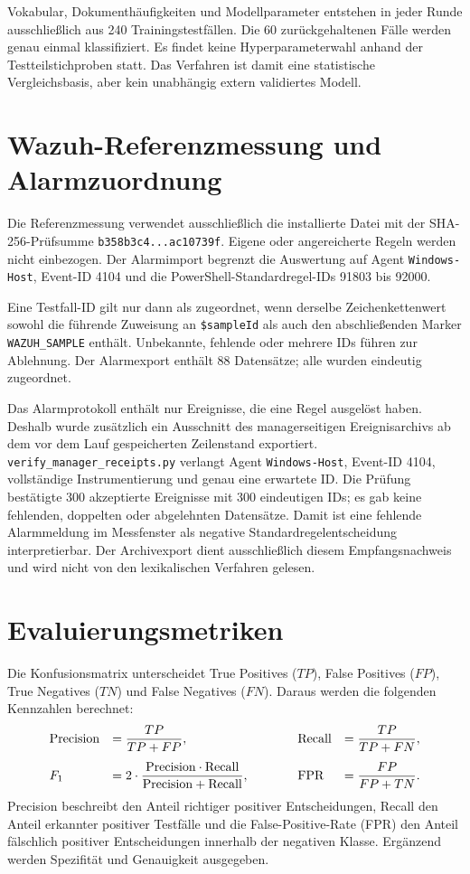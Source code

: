 \documentclass[12pt,a4paper,oneside,parskip=half]{scrreprt}
\begin{document}
Vokabular, Dokumenthäufigkeiten und Modellparameter entstehen in jeder Runde ausschließlich aus 240 Trainingstestfällen. Die 60 zurückgehaltenen Fälle werden genau einmal klassifiziert. Es findet keine Hyperparameterwahl anhand der Testteilstichproben statt. Das Verfahren ist damit eine statistische Vergleichsbasis, aber kein unabhängig extern validiertes Modell.
\section{Wazuh-Referenzmessung und Alarmzuordnung}
Die Referenzmessung verwendet ausschließlich die installierte Datei  mit der SHA-256-Prüfsumme \texttt{b358b3c4...ac10739f}. Eigene oder angereicherte Regeln werden nicht einbezogen. Der Alarmimport begrenzt die Auswertung auf Agent \texttt{Windows-Host}, Event-ID 4104 und die PowerShell-Standardregel-IDs 91803 bis 92000.

Eine Testfall-ID gilt nur dann als zugeordnet, wenn derselbe Zeichenkettenwert sowohl die führende Zuweisung an \texttt{\$sampleId} als auch den abschließenden Marker \texttt{WAZUH\_SAMPLE} enthält. Unbekannte, fehlende oder mehrere IDs führen zur Ablehnung. Der Alarmexport enthält 88 Datensätze; alle wurden eindeutig zugeordnet.

Das Alarmprotokoll enthält nur Ereignisse, die eine Regel ausgelöst haben. Deshalb wurde zusätzlich ein Ausschnitt des managerseitigen Ereignisarchivs ab dem vor dem Lauf gespeicherten Zeilenstand exportiert. \texttt{verify\_manager\_receipts.py} verlangt Agent \texttt{Windows-Host}, Event-ID 4104, vollständige Instrumentierung und genau eine erwartete ID. Die Prüfung bestätigte 300 akzeptierte Ereignisse mit 300 eindeutigen IDs; es gab keine fehlenden, doppelten oder abgelehnten Datensätze. Damit ist eine fehlende Alarmmeldung im Messfenster als negative Standardregelentscheidung interpretierbar. Der Archivexport dient ausschließlich diesem Empfangsnachweis und wird nicht von den lexikalischen Verfahren gelesen.
\section{Evaluierungsmetriken}
Die Konfusionsmatrix unterscheidet True Positives (\(TP\)), False Positives (\(FP\)), True Negatives (\(TN\)) und False Negatives (\(FN\)). Daraus werden die folgenden Kennzahlen berechnet:
\[
\begin{array}{@{}ll@{\qquad\qquad}ll@{}}
\mathrm{Precision} & \displaystyle = \frac{TP}{TP+FP}, &
\mathrm{Recall} & \displaystyle = \frac{TP}{TP+FN},\\[1.2em]
F_1 & \displaystyle = 2\cdot
\frac{\mathrm{Precision}\cdot\mathrm{Recall}}
{\mathrm{Precision}+\mathrm{Recall}}, &
\mathrm{FPR} & \displaystyle = \frac{FP}{FP+TN}.
\end{array}
\]
Precision beschreibt den Anteil richtiger positiver Entscheidungen, Recall den Anteil erkannter positiver Testfälle und die False-Positive-Rate (FPR) den Anteil fälschlich positiver Entscheidungen innerhalb der negativen Klasse. Ergänzend werden Spezifität und Genauigkeit ausgegeben.
\end{document}
